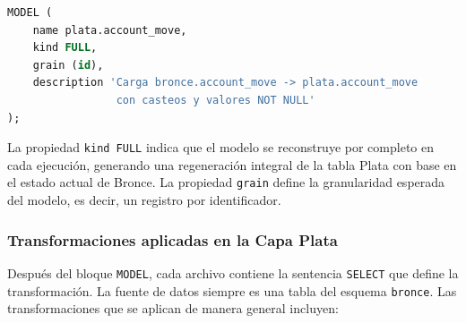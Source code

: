\begin{lstlisting}[language=SQL, breaklines=true]
MODEL (
    name plata.account_move,
    kind FULL,
    grain (id),
    description 'Carga bronce.account_move -> plata.account_move 
                 con casteos y valores NOT NULL'
);
\end{lstlisting}

La propiedad \texttt{kind FULL} indica que el modelo se reconstruye por completo en cada ejecución, generando una regeneración integral de la tabla Plata con base en el estado actual de Bronce. La propiedad \texttt{grain} define la granularidad esperada del modelo, es decir, un registro por identificador.

\subsubsection{Transformaciones aplicadas en la Capa Plata}

Después del bloque \texttt{MODEL}, cada archivo contiene la sentencia \texttt{SELECT} que define la transformación. La fuente de datos siempre es una tabla del esquema \texttt{bronce}. Las transformaciones que se aplican de manera general incluyen:

